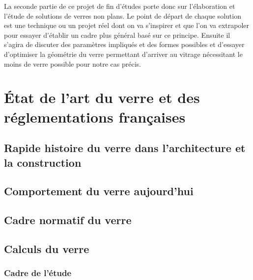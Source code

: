\documentclass[11pt,titlepage]{article}
\begin{document}
La seconde partie de ce projet de fin d'études porte donc sur l'élaboration et l'étude de solutions de verres non plans. Le point de départ de chaque solution est une technique ou un projet réel dont on va s'inspirer et que l'on va extrapoler pour essayer d'établir un cadre plus général basé sur ce principe. Ensuite il s'agira de discuter des paramètres impliqués et des formes possibles et d'essayer d'optimiser la géométrie du verre permettant d'arriver au vitrage nécessitant le moins de verre possible pour notre cas précis.

\newpage
\section{État de l'art du verre et des réglementations françaises}
\subsection{Rapide histoire du verre dans l'architecture et la construction}
\subsection{Comportement du verre aujourd'hui}
\subsection{Cadre normatif du verre}
\subsection{Calculs du verre}
\subsubsection{Cadre de l'étude}
\end{document}
